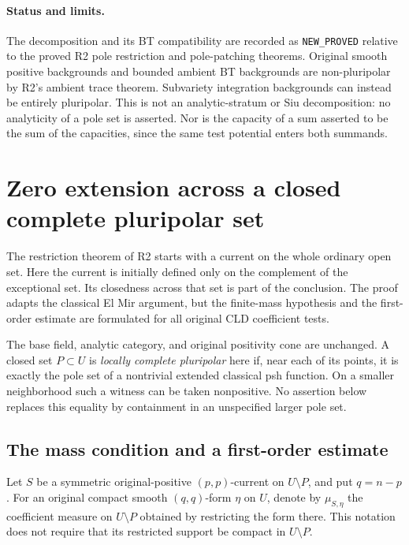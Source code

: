 \documentclass[11pt,a4paper]{article}
\numberwithin{equation}{section}
\theoremstyle{definition}
\theoremstyle{remark}
\begin{document}
\paragraph{Status and limits.}
The decomposition and its BT compatibility are recorded as
\texttt{NEW\_PROVED} relative to the proved R2 pole
restriction and pole-patching theorems. Original smooth
positive backgrounds and bounded ambient BT backgrounds are
non-pluripolar by R2's ambient trace theorem. Subvariety
integration backgrounds can instead be entirely pluripolar.
This is not an analytic-stratum or Siu decomposition: no
analyticity of a pole set is asserted. Nor is the capacity
of a sum asserted to be the sum of the capacities, since
the same test potential enters both summands.




\section{Zero extension across a closed complete pluripolar set}
\label{sec:r3-zero-extension}

The restriction theorem of R2 starts with a current on the whole
ordinary open set. Here the current is initially defined only on the
complement of the exceptional set. Its closedness across that set is
part of the conclusion. The proof adapts the classical El Mir
argument, but the finite-mass hypothesis and the first-order estimate
are formulated for all original CLD coefficient tests.

The base field, analytic category, and original positivity cone are
unchanged. A closed set $P\subset U$ is \emph{locally complete
pluripolar} here if, near each of its points, it is exactly the pole
set of a nontrivial extended classical psh function. On a smaller
neighborhood such a witness can be taken nonpositive. No assertion
below replaces this equality by containment in an unspecified
larger pole set.

\subsection{The mass condition and a first-order estimate}

Let $S$ be a symmetric original-positive $(p,p)$-current on
$U\setminus P$, and put $q=n-p$. For an original compact smooth
$(q,q)$-form $\eta$ on $U$, denote by $\mu_{S,\eta}$ the coefficient
measure on $U\setminus P$ obtained by restricting the form there.
This notation does not require that its restricted support be
compact in $U\setminus P$.
\end{document}
